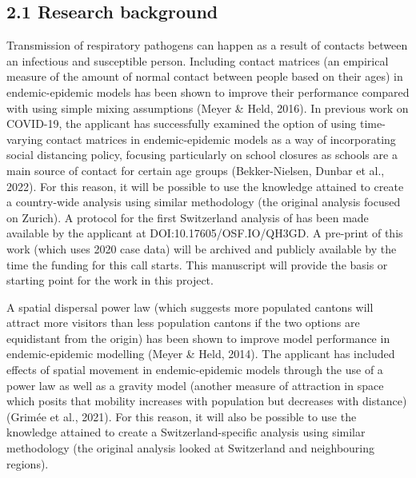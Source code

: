 \documentclass[authordate, rga]{jote-new-article}
\begin{document}
\subsection{2.1 Research background}



Transmission of respiratory pathogens can happen as a result of contacts between an infectious and susceptible person. Including contact matrices (an empirical measure of the amount of normal contact between people based on their ages) in endemic-epidemic models has been shown to improve their performance compared with using simple mixing assumptions (Meyer \& Held, 2016). In previous work on COVID-19, the applicant has successfully examined the option of using time-varying contact matrices in endemic-epidemic models as a way of incorporating social distancing policy, focusing particularly on school closures as schools are a main source of contact for certain age groups (Bekker-Nielsen, Dunbar et al., 2022). For this reason, it will be possible to use the knowledge attained to create a country-wide analysis using similar methodology (the original analysis focused on Zurich). A protocol for the first Switzerland analysis of has been made available by the applicant at DOI:10.17605/OSF.IO/QH3GD. A pre-print of this work (which uses 2020 case data) will be archived and publicly available by the time the funding for this call starts. This manuscript will provide the basis or starting point for the work in this project.







A spatial dispersal power law (which suggests more populated cantons will attract more visitors than less population cantons if the two options are equidistant from the origin) has been shown to improve model performance in endemic-epidemic modelling (Meyer \& Held, 2014). The applicant has included effects of spatial movement in endemic-epidemic models through the use of a power law as well as a gravity model (another measure of attraction in space which posits that mobility increases with population but decreases with distance) (Grimée et al., 2021). For this reason, it will also be possible to use the knowledge attained to create a Switzerland-specific analysis using similar methodology (the original analysis looked at Switzerland and neighbouring regions).
\end{document}
